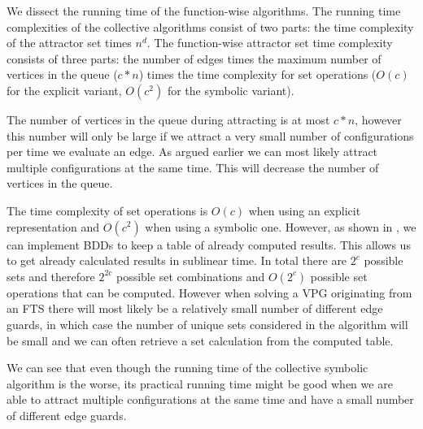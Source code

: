 We dissect the running time of the function-wise algorithms. The running time complexities of the collective algorithms consist of two parts: the time complexity of the attractor set times $n^d$. The function-wise attractor set time complexity consists of three parts: the number of edges times the maximum number of vertices in the queue ($c*n$) times the time complexity for set operations ($O(c)$ for the explicit variant, $O(c^2)$ for the symbolic variant).

The number of vertices in the queue during attracting is at most $c*n$, however this number will only be large if we attract a very small number of configurations per time we evaluate an edge. As argued earlier we can most likely attract multiple configurations at the same time. This will decrease the number of vertices in the queue.

The time complexity of set operations is $O(c)$ when using an explicit representation and $O(c^2)$ when using a symbolic one. However, as shown in \cite{BDD_running_time}, we can implement BDDs to keep a table of already computed results. This allows us to get already calculated results in sublinear time. In total there are $2^c$ possible sets and therefore $2^{2c}$ possible set combinations and $O(2^c)$ possible set operations that can be computed. However when solving a VPG originating from an FTS there will most likely be a relatively small number of different edge guards, in which case the number of unique sets considered in the algorithm will be small and we can often retrieve a set calculation from the computed table.

We can see that even though the running time of the collective symbolic algorithm is the worse, its practical running time might be good when we are able to attract multiple configurations at the same time and have a small number of different edge guards.